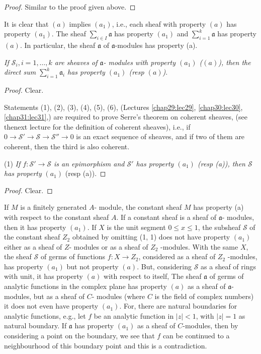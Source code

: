 \begin{proof}
Similar to the proof given above.
\end{proof}

It is clear that $(a)$ implies $(a_1)$, i.e., each sheaf with property
$(a)$ has property $(a_1)$. The sheaf $\sum \limits_{i \in I}
\mathfrak{a}$ has property $(a_1)$ and $\sum^k_{i=1} \mathfrak{a}$ has property
$(a)$. In particular, the sheaf $\mathfrak{a}$ of
$\mathfrak{a}$-modules has property (a). 


\textit{If $\mathscr{S}_i, i=1, \ldots,k$ are sheaves of $\mathfrak{a}$- modules
  with property $(a_1)$ (\resp $(a)$), then the direct sum
  $\sum^k_{i=1} \mathfrak{a}_i$ has property $(a_1)$ (resp $(a)$)}. 

\begin{proof}
Clear.

Statements (1), (2), (3), (4), (5), (6), (Lectures \ref{chap29:lec29},
\ref{chap30:lec30}, \ref{chap31:lec31},) are required to prove Serre's
theorem on coherent 
sheaves, (see the\pageoriginale next lecture for the definition of coherent
sheaves), i.e., if $0 \to \mathscr{S}' \to \mathscr{S} \to
\mathscr{S}'' \to 0$ is an exact sequence of sheaves, and if two of
them are coherent, then the third is also coherent.  

\noindent
(1) \qquad \textit{If $f : \mathscr{S}' \to \mathscr{S}$ is an
  epimorphism and $\mathscr{S}'$ has property $(a_1)$ (resp (a)),
  then $\mathscr{S}$ has property} $(a_1)$ (resp (a)). 
\end{proof}

\begin{proof}
Clear.
\end{proof}

\begin{example*}
If $M$ is a finitely generated $A$- module, the constant sheaf $M$ has
property (a) with respect to the constant sheaf $A$. If a constant
sheaf is a sheaf of $\mathfrak{a}$- modules, then it has property
$(a_1)$. If $X$ 
is the unit segment $0 \leq x \leq 1$, the subsheaf $\mathscr{S}$ of
the constant sheaf $Z_2$ obtained by omitting (1, 1) does not have
property $(a_1)$ either as a sheaf of $Z$- modules or as a sheaf of
$Z_2$ -modules. With the same $X$, the sheaf $\mathscr{S}$ of germs of
functions $f : X \to Z_2$, considered as a sheaf of $Z_2$ -modules,
has property $(a_1)$ but not property $(a)$. But, considering
$\mathscr{S}$ as a sheaf of rings with unit, it has property $(a)$
with respect to itself, The sheaf $\mathfrak{a}$ of germs of analytic
functions in the complex plane has property $(a)$ as a sheaf of
$\mathfrak{a}$- modules, but as a sheaf of $C$- modules (where $C$ is
the field of complex numbers) it does not even have property
$(a_1)$. For, there are natural boundaries for analytic functions,
e.g., let $f$ be an analytic function in $|z|<1$, with $|z| = 1$ as
natural boundary. If $\mathfrak{a}$ has property $(a_1)$ as a sheaf of
$C$-modules, then by considering a point on the boundary, we see that
$f$ can be continued to a neighbourhood of this boundary point and
this is a contradiction.  
\end{example*}

